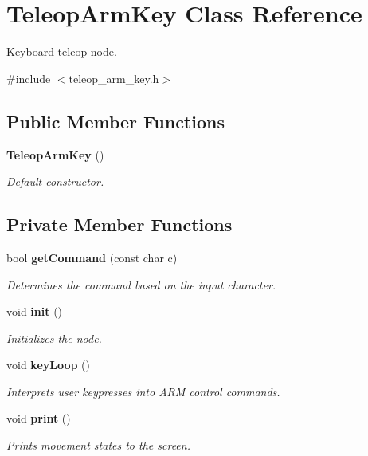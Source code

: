 \section{\-Teleop\-Arm\-Key \-Class \-Reference}
\label{classTeleopArmKey}


\-Keyboard teleop node.  




{\ttfamily \#include $<$teleop\-\_\-arm\-\_\-key.\-h$>$}

\subsection*{\-Public \-Member \-Functions}
\begin{DoxyCompactItemize}
\item 
{\bf \-Teleop\-Arm\-Key} ()
\begin{DoxyCompactList}\small\item\em \-Default constructor. \end{DoxyCompactList}\end{DoxyCompactItemize}
\subsection*{\-Private \-Member \-Functions}
\begin{DoxyCompactItemize}
\item 
bool {\bf get\-Command} (const char c)
\begin{DoxyCompactList}\small\item\em \-Determines the command based on the input character. \end{DoxyCompactList}\item 
void {\bf init} ()
\begin{DoxyCompactList}\small\item\em \-Initializes the node. \end{DoxyCompactList}\item 
void {\bf key\-Loop} ()
\begin{DoxyCompactList}\small\item\em \-Interprets user keypresses into \-A\-R\-M control commands. \end{DoxyCompactList}\item 
void {\bf print} ()
\begin{DoxyCompactList}\small\item\em \-Prints movement states to the screen. \end{DoxyCompactList}\end{DoxyCompactItemize}

